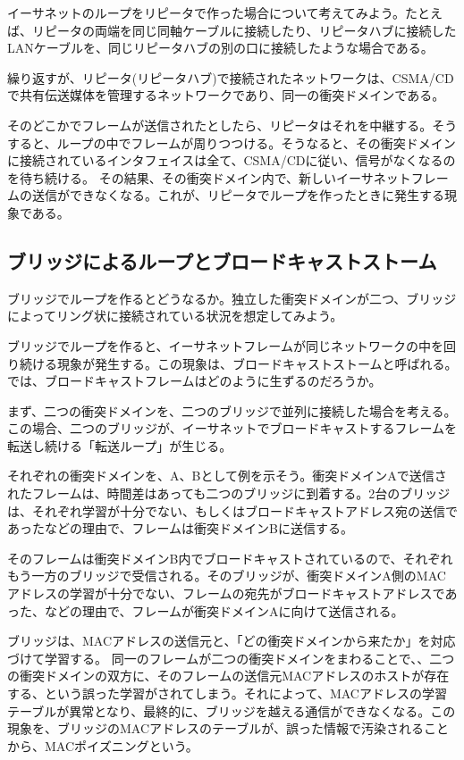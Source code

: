 イーサネットのループをリピータで作った場合について考えてみよう。たとえば、リピータの両端を同じ同軸ケーブルに接続したり、リピータハブに接続したLANケーブルを、同じリピータハブの別の口に接続したような場合である。

繰り返すが、リピータ(リピータハブ)で接続されたネットワークは、CSMA/CDで共有伝送媒体を管理するネットワークであり、同一の衝突ドメインである。

そのどこかでフレームが送信されたとしたら、リピータはそれを中継する。そうすると、ループの中でフレームが周りつつける。そうなると、その衝突ドメインに接続されているインタフェイスは全て、CSMA/CDに従い、信号がなくなるのを待ち続ける。
その結果、その衝突ドメイン内で、新しいイーサネットフレームの送信ができなくなる。これが、リピータでループを作ったときに発生する現象である。

\subsection{ブリッジによるループとブロードキャストストーム}

ブリッジでループを作るとどうなるか。独立した衝突ドメインが二つ、ブリッジによってリング状に接続されている状況を想定してみよう。

ブリッジでループを作ると、イーサネットフレームが同じネットワークの中を回り続ける現象が発生する。この現象は、ブロードキャストストームと呼ばれる。では、ブロードキャストフレームはどのように生ずるのだろうか。

まず、二つの衝突ドメインを、二つのブリッジで並列に接続した場合を考える。この場合、二つのブリッジが、イーサネットでブロードキャストするフレームを転送し続ける「転送ループ」が生じる。

それぞれの衝突ドメインを、A、Bとして例を示そう。衝突ドメインAで送信されたフレームは、時間差はあっても二つのブリッジに到着する。2台のブリッジは、それぞれ学習が十分でない、もしくはブロードキャストアドレス宛の送信であったなどの理由で、フレームは衝突ドメインBに送信する。

そのフレームは衝突ドメインB内でブロードキャストされているので、それぞれもう一方のブリッジで受信される。そのブリッジが、衝突ドメインA側のMACアドレスの学習が十分でない、フレームの宛先がブロードキャストアドレスであった、などの理由で、フレームが衝突ドメインAに向けて送信される。

ブリッジは、MACアドレスの送信元と、「どの衝突ドメインから来たか」を対応づけて学習する。
同一のフレームが二つの衝突ドメインをまわることで、、二つの衝突ドメインの双方に、そのフレームの送信元MACアドレスのホストが存在する、という誤った学習がされてしまう。それによって、MACアドレスの学習テーブルが異常となり、最終的に、ブリッジを越える通信ができなくなる。この現象を、ブリッジのMACアドレスのテーブルが、誤った情報で汚染されることから、MACポイズニングという。

